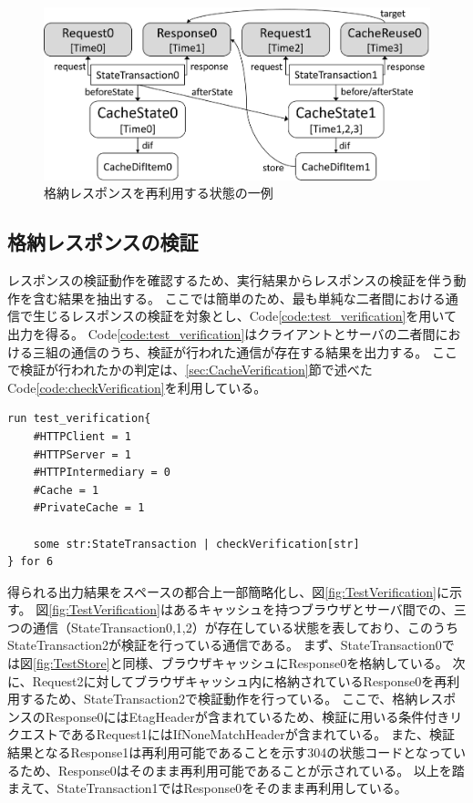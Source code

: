 \documentclass[12pt,a4paper]{jbook}
\begin{document}
\begin{figure}[htb]
\centering
\includegraphics[width=450pt]{./fig/TestReuse.eps}
\caption{格納レスポンスを再利用する状態の一例}
\label{fig:TestReuse}
\end{figure}

\subsection{格納レスポンスの検証}
レスポンスの検証動作を確認するため、実行結果からレスポンスの検証を伴う動作を含む結果を抽出する。
ここでは簡単のため、最も単純な二者間における通信で生じるレスポンスの検証を対象とし、Code\ref{code:test_verification}を用いて出力を得る。
Code\ref{code:test_verification}はクライアントとサーバの二者間における三組の通信のうち、検証が行われた通信が存在する結果を出力する。
ここで検証が行われたかの判定は、\ref{sec:CacheVerification}節で述べたCode\ref{code:checkVerification}を利用している。

\begin{lstlisting}[caption=格納レスポンスの検証, label=code:test_verification]
run test_verification{
	#HTTPClient = 1
	#HTTPServer = 1
	#HTTPIntermediary = 0
	#Cache = 1
	#PrivateCache = 1

	some str:StateTransaction | checkVerification[str]
} for 6
\end{lstlisting}

得られる出力結果をスペースの都合上一部簡略化し、図\ref{fig:TestVerification}に示す。
図\ref{fig:TestVerification}はあるキャッシュを持つブラウザとサーバ間での、三つの通信（StateTransaction0,1,2）が存在している状態を表しており、このうちStateTransaction2が検証を行っている通信である。
まず、StateTransaction0では図\ref{fig:TestStore}と同様、ブラウザキャッシュにResponse0を格納している。
次に、Request2に対してブラウザキャッシュ内に格納されているResponse0を再利用するため、StateTransaction2で検証動作を行っている。
ここで、格納レスポンスのResponse0にはEtagHeaderが含まれているため、検証に用いる条件付きリクエストであるRequest1にはIfNoneMatchHeaderが含まれている。
また、検証結果となるResponse1は再利用可能であることを示す304の状態コードとなっているため、Response0はそのまま再利用可能であることが示されている。
以上を踏まえて、StateTransaction1ではResponse0をそのまま再利用している。
\end{document}
